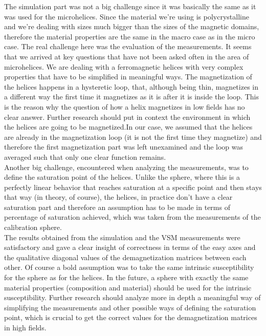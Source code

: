 The simulation part was not a big challenge since it was basically the same as it was used for the microhelices. Since the material we're using is polycrystalline and we're dealing with sizes much bigger than the sizes of the magnetic domains, therefore the material properties are the same in the macro case as in the micro case. The real challenge here was the evaluation of the measurements. It seems that we arrived at key questions that have not been asked often in the area of microhelices. We are dealing with a ferromagnetic helices with very complex properties that have to be simplified in meaningful ways. The magnetization of the helices happens in a hysteretic loop, that, although being thin, magnetizes in a different way the first time it magnetizes as it is after it is inside the loop. This is the reason why the question of how a helix magnetizes in low fields has no clear answer. Further research should put in context the environment in which the helices are going to be magnetized.In our case, we assumed that the helices are already in the magnetization loop (it is not the first time they magnetize) and therefore the first magnetization part was left unexamined and the loop was averaged such that only one clear function remains.\\

Another big challenge, encountered when analyzing the measurements, was to define the saturation point of the helices. Unlike the sphere, where this is a perfectly linear behavior that reaches saturation at a specific point and then stays that way (in theory, of course), the helices, in practice don't have a clear saturation part and therefore an assumption has to be made in terms of percentage of saturation achieved, which was taken from the measurements of the calibration sphere.\\

The results obtained from the simulation and the VSM measurements were satisfactory and gave a clear insight of correctness in terms of the easy axes and the qualitative diagonal values of the demagnetization matrices between each other. Of course a bold assumption was to take the same intrinsic susceptibility for the sphere as for the helices. In the future, a sphere with exactly the same material properties (composition and material) should be used for the intrinsic susceptibility. Further research should analyze more in depth a meaningful way of simplifying the measurements and other possible ways of defining the saturation point, which is crucial to get the correct values for the demagnetization matrices in high fields.\\

